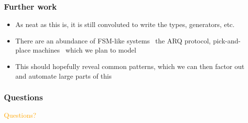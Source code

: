 \documentclass[compress,handout]{beamer}
\begin{document}


\begin{frame}
  \frametitle{Further work}

  \begin{itemize}
    \item<1-> As neat as this is, it is still convoluted to write the types,
              generators, etc.
    \item<2-> There are an abundance of FSM-like systems \textemdash\ the ARQ
              protocol, pick-and-place machines \textemdash\ which we plan to
              model
    \item<3-> This should hopefully reveal common patterns, which we can then
              factor out and automate large parts of this
  \end{itemize}

\end{frame}


\begin{frame}
  \frametitle{Questions}

  \begin{center}
    \textcolor<1>{orange}{\Large Questions?}
  \end{center}

\end{frame}

\end{document}
